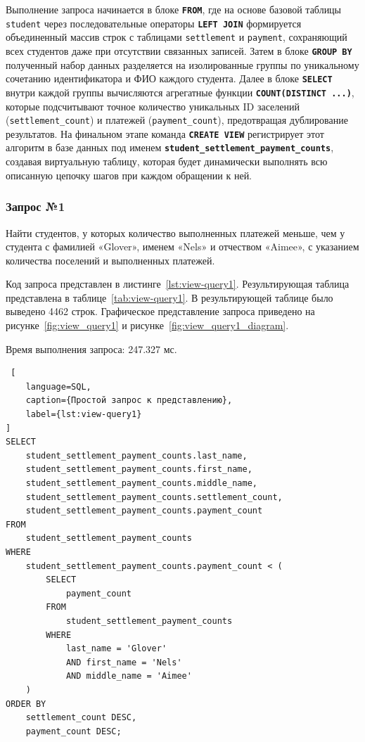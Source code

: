 Выполнение запроса начинается в блоке \textbf{\texttt{FROM}}, где на основе базовой таблицы \texttt{student} через последовательные операторы \textbf{\texttt{LEFT JOIN}} формируется объединенный массив строк с таблицами \texttt{settlement} и \texttt{payment}, сохраняющий всех студентов даже при отсутствии связанных записей. Затем в блоке \textbf{\texttt{GROUP BY}} полученный набор данных разделяется на изолированные группы по уникальному сочетанию идентификатора и ФИО каждого студента. Далее в блоке \textbf{\texttt{SELECT}} внутри каждой группы вычисляются агрегатные функции \textbf{\texttt{COUNT(DISTINCT ...)}}, которые подсчитывают точное количество уникальных ID заселений (\texttt{settlement\_count}) и платежей (\texttt{payment\_count}), предотвращая дублирование результатов. На финальном этапе команда \textbf{\texttt{CREATE VIEW}} регистрирует этот алгоритм в базе данных под именем \textbf{\texttt{student\_settlement\_payment\_counts}}, создавая виртуальную таблицу, которая будет динамически выполнять всю описанную цепочку шагов при каждом обращении к ней.

\subsubsection{Запрос №1}

Найти студентов, у которых количество выполненных платежей меньше, чем у студента с фамилией «Glover», именем «Nels» и отчеством «Aimee», с указанием количества поселений и выполненных платежей.

Код запроса представлен в листинге~\ref{lst:view-query1}. Результирующая таблица представлена в таблице~\ref{tab:view-query1}. В результирующей таблице было выведено 4462 строк. Графическое представление запроса приведено на рисунке~\ref{fig:view_query1} и рисунке~\ref{fig:view_query1_diagram}. 

Время выполнения запроса: 247.327 мс.

\begin{lstlisting} [
    language=SQL,
    caption={Простой запрос к представлению},
    label={lst:view-query1}
]
SELECT
    student_settlement_payment_counts.last_name,
    student_settlement_payment_counts.first_name,
    student_settlement_payment_counts.middle_name,
    student_settlement_payment_counts.settlement_count,
    student_settlement_payment_counts.payment_count
FROM
    student_settlement_payment_counts
WHERE
    student_settlement_payment_counts.payment_count < (
        SELECT
            payment_count
        FROM
            student_settlement_payment_counts
        WHERE
            last_name = 'Glover'
            AND first_name = 'Nels'
            AND middle_name = 'Aimee'
    )
ORDER BY
    settlement_count DESC,
    payment_count DESC;
\end{lstlisting}

